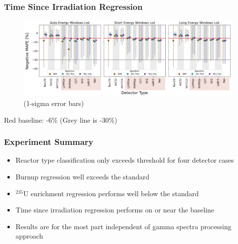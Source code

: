 \begin{frame}
  \frametitle{Time Since Irradiation Regression}
  \begin{adjustwidth}{-15pt}{-10pt}
  \begin{figure}
    \centering
    \includegraphics[width=1.1\textwidth]{./figures/detector_preds_wrt_enlist_MAPE_cool.png}
    \scriptsize (1-sigma error bars)
  \end{figure}
  \vspace{12pt} \centering Red baseline: -6\% (Grey line is -30\%) 
  \end{adjustwidth}
\end{frame}

\begin{frame}
  \frametitle{Experiment Summary}
  \begin{itemize}
    \item Reactor type classification only exceeds threshold for four detector
    cases
    \item Burnup regression well exceeds the standard
    \item ${}^{235}\text{U}$ enrichment regression performs well below the
    standard
    \item Time since irradiation regression performs on or near the baseline
    \item Results are for the most part independent of gamma spectra processing 
    approach
  \end{itemize}
\end{frame}

